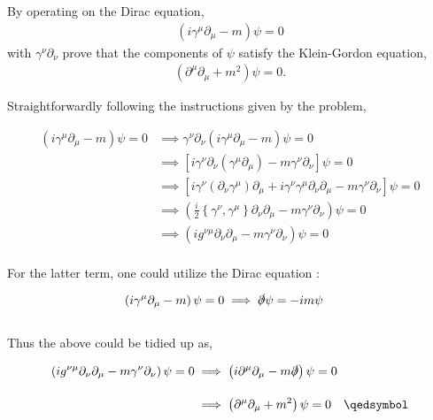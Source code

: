 \begin{problem}{4.7}
By operating on the Dirac equation,
\begin{align*}
    \left( i\gamma^\mu \partial_\mu - m \right) \psi = 0
\end{align*}
with $\gamma^\nu\partial_\nu$ prove that the components of $\psi$ satisfy the Klein-Gordon equation,
\begin{align*}
    \left( \partial^\mu \partial_\mu +m^2 \right) \psi = 0.
\end{align*}
\end{problem}
\begin{solution}
Straightforwardly following the instructions given by the problem, 

\begin{align*}
    \left( i\gamma^\mu \partial_\mu - m \right) \psi = 0  &\implies \gamma^\nu \partial_\nu \left( i\gamma^\mu \partial_\mu - m \right) \psi = 0 \\[0.15in]
     &\implies \left[  i \gamma^\nu \partial_\nu \left( \gamma^\mu \partial_\mu  \right) - m \gamma^\nu \partial_\nu \right] \psi = 0 \\[0.15in]
     &\implies \left[  i \gamma^\nu \left( \partial_\nu  \gamma^\mu \right) \partial_\mu   +  i \gamma^\nu  \gamma^\mu \partial_\nu   \partial_\mu    - m \gamma^\nu \partial_\nu \right] \psi = 0 \\[0.15in]
     &\implies \left(  \frac{i}{2} \left\{ \gamma^\nu , \gamma^\mu \right\} \partial_\nu   \partial_\mu    - m \gamma^\nu \partial_\nu \right) \psi = 0 \\[0.15in]
     &\implies \left( i g^{\nu\mu} \partial_\nu   \partial_\mu    - m \gamma^\nu \partial_\nu \right) \psi = 0 
\end{align*}\\
For the latter term, one could utilize the Dirac equation :

\begin{align*}
    \left( i\gamma^\mu \partial_\mu - m \right) \psi = 0  &\implies \slashed{\partial}\psi = -im \psi 
\end{align*}\\
Thus the above could be tidied up as, 

\begin{align*}
    \left( i g^{\nu\mu} \partial_\nu   \partial_\mu    - m \gamma^\nu \partial_\nu \right) \psi = 0 &\implies \left( i\partial^\mu\partial_\mu - m \slashed{\partial}  \right) \psi = 0 \\[0.15in]
    &\implies \left( \partial^\mu\partial_\mu +m^2 \right) \psi = 0  \qed
\end{align*}
\end{solution}

